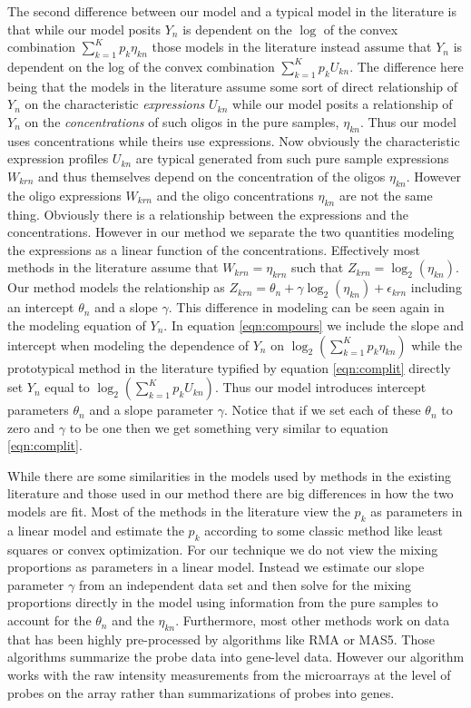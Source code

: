 \documentclass[reqno,12pt,oneside]{report}\usepackage[]{graphicx}\usepackage[]{color}
\theoremstyle{plain}
\theoremstyle{definition}
\theoremstyle{remark}
\numberwithin{theorem}{chapter}     %
\begin{document}
The second difference between our model and a typical model in the literature is that while our model posits $Y_n$ is dependent on the $\log$ of the convex combination $\sum_{k=1}^{K}p_k\eta_{kn}$ those models in the literature instead assume that $Y_n$ is dependent on the log of the convex combination $\sum_{k=1}^{K}p_kU_{kn}$. The difference here being that the models in the literature assume some sort of direct relationship of $Y_n$ on the characteristic \emph{expressions} $U_{kn}$ while our model posits a relationship of $Y_n$ on the \emph{concentrations} of such oligos in the pure samples, $\eta_{kn}$. Thus our model uses concentrations while theirs use expressions.  Now obviously the characteristic expression profiles $U_{kn}$ are typical generated from such pure sample expressions $W_{krn}$ and thus themselves depend on the concentration of the oligos $\eta_{kn}$. However the oligo expressions $W_{krn}$ and the oligo concentrations $\eta_{kn}$ are not the same thing. Obviously there is a relationship between the expressions and the concentrations. However in our method we separate the two quantities modeling the expressions as a linear function of the concentrations. Effectively most methods in the literature assume that $W_{krn} = \eta_{krn}$ such that $Z_{krn} = \log_2\left(\eta_{kn}\right)$. Our method models the relationship as $Z_{krn}=\theta_n+\gamma\log_2\left(\eta_{kn}\right)+\epsilon_{krn}$ including an intercept $\theta_n$ and a slope $\gamma$. This difference in modeling can be seen again in the modeling equation of $Y_n$. In equation \ref{eqn:compours} we include the slope and intercept when modeling the dependence of $Y_n$ on $\log_2\left(\sum_{k=1}^{K}p_k\eta_{kn}\right)$ while the prototypical method in the literature typified by equation \ref{eqn:complit} directly set $Y_n$ equal to $\log_2\left(\sum_{k=1}^{K}p_kU_{kn}\right)$. Thus our model introduces intercept parameters $\theta_n$ and a slope parameter $\gamma$. Notice that if we set each of these $\theta_n$ to zero and $\gamma$ to be one then we get something very similar to equation \ref{eqn:complit}.

While there are some similarities in the models used by methods in the existing literature and those used in our method there are big differences in how the two models are fit. Most of the methods in the literature view the $p_k$ as parameters in a linear model and estimate the $p_k$ according to some classic method like least squares or convex optimization. For our technique we do not view the mixing proportions as parameters in a linear model. Instead we estimate our slope parameter $\gamma$ from an independent data set and then solve for the mixing proportions directly in the model using information from the pure samples to account for the $\theta_n$ and the $\eta_{kn}$. Furthermore, most other methods work on data that has been highly pre-processed by algorithms like RMA or MAS5. Those algorithms summarize the probe data into gene-level data. However our algorithm works with the raw intensity measurements from the microarrays at the level of probes on the array rather than summarizations of probes into genes. 
\end{document}
